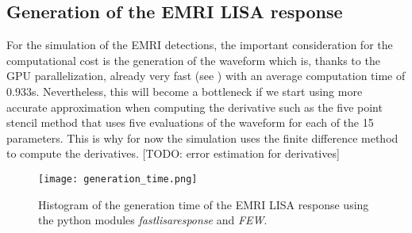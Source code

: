 \subsection{Generation of the EMRI LISA response}\label{subsec:generation-of-the-emri-lisa-response}
For the simulation of the EMRI detections, the important consideration for the computational cost is the generation of the waveform which is, thanks to the GPU parallelization, already very fast (see ) with an average computation time of $0.933$s. Nevertheless, this will become a bottleneck if we start using more accurate approximation when computing the derivative such as the five point stencil method that uses five evaluations of the waveform for each of the 15 parameters. This is why for now the simulation uses the finite difference method  to compute the derivatives. [TODO: error estimation for derivatives]
\begin{figure}
    \centering
    \texttt{[image: generation\_time.png]}
    \caption[Waveform generation time histogram]{Histogram of the generation time of the EMRI LISA response using the python modules \emph{fastlisaresponse} and \emph{FEW}.}
    \label{fig:waveform-generation-time}
\end{figure}

